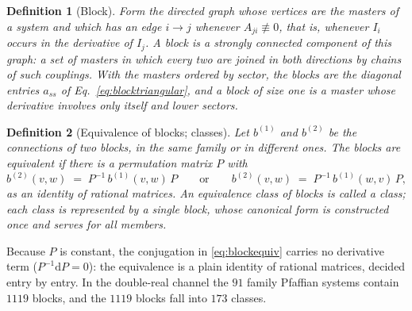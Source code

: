 \documentclass[11pt]{article}
\newcommand{\dd}{\mathrm{d}}
\newtheorem{definition}{Definition}[section]
\begin{document}
\begin{definition}[Block]
Form the directed graph whose vertices are the masters of a system
and which has an edge $i \to j$ whenever $A_{ji} \not\equiv 0$, that
is, whenever $I_i$ occurs in the derivative of $I_j$.  A \emph{block}
is a strongly connected component of this graph: a set of masters in
which every two are joined in both directions by chains of such
couplings.  With the masters ordered by sector, the blocks are the
diagonal entries $a_{ss}$ of Eq.~\eqref{eq:blocktriangular}, and a
block of size one is a master whose derivative involves only itself
and lower sectors.
\end{definition}

\begin{definition}[Equivalence of blocks; classes]
\label{def:class}
Let $b^{(1)}$ and $b^{(2)}$ be the connections of two blocks, in the
same family or in different ones.  The blocks are \emph{equivalent}
if there is a permutation matrix $P$ with
\begin{equation}
  b^{(2)}(v,w) \;=\; P^{-1}\, b^{(1)}(v,w)\, P
  \qquad\text{or}\qquad
  b^{(2)}(v,w) \;=\; P^{-1}\, b^{(1)}(w,v)\, P ,
  \label{eq:blockequiv}
\end{equation}
as an identity of rational matrices.  An equivalence class of
blocks is called a \emph{class}; each class is represented by a
single block, whose canonical form is constructed once and serves
for all members.
\end{definition}

Because $P$ is constant, the conjugation in \eqref{eq:blockequiv}
carries no derivative term ($P^{-1}\dd P = 0$): the equivalence is a
plain identity of rational matrices, decided entry by entry.  In the
double-real channel the $91$ family Pfaffian systems contain $1119$
blocks,
and the $1119$ blocks fall into $173$ classes.
\end{document}
